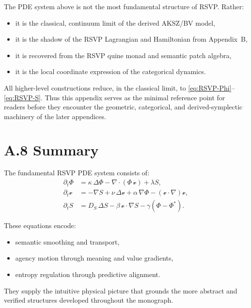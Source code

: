 The PDE system above is not the most fundamental structure of RSVP.
Rather:
\begin{itemize}
  \item it is the classical, continuum limit of the derived AKSZ/BV model,
  \item it is the shadow of the RSVP Lagrangian and Hamiltonian from Appendix~B,
  \item it is recovered from the RSVP quine monad and semantic patch algebra,
  \item it is the local coordinate expression of the categorical dynamics.
\end{itemize}

All higher-level constructions reduce, in the classical limit, to
\eqref{eq:RSVP-Phi}--\eqref{eq:RSVP-S}.  
Thus this appendix serves as the minimal reference point for readers before they
encounter the geometric, categorical, and derived-symplectic machinery of the
later appendices.

\section*{A.8 \; Summary}

The fundamental RSVP PDE system consists of:
\begin{align*}
\partial_t\Phi &= \kappa\,\Delta\Phi
                   - \nabla\!\cdot(\Phi\,\mathcal{v})
                   + \lambda S, \\
\partial_t\mathcal{v}
  &= -\nabla S
     + \nu\,\Delta\mathcal{v}
     + \alpha\,\nabla\Phi
     - (\mathcal{v}\!\cdot\nabla)\mathcal{v}, \\
\partial_t S
  &= D_S\,\Delta S
     - \beta\,\mathcal{v}\!\cdot\nabla S
     - \gamma(\Phi - \Phi^\ast).
\end{align*}

These equations encode:
\begin{itemize}
  \item semantic smoothing and transport,
  \item agency motion through meaning and value gradients,
  \item entropy regulation through predictive alignment.
\end{itemize}

They supply the intuitive physical picture that grounds the more abstract and
verified structures developed throughout the monograph.

